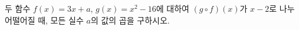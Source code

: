 \hspace*{2mm}\begin{minipage}[t]{\dimexpr\linewidth-2mm\relax}\vspace{0pt}
두 함수 $f(x)=3x+a$, $g(x)=x^2-16$에 대하여 $(g\circ f)(x)$가 $x-2$로 나누어떨어질 때, 모든 실수 $a$의 값의 곱을 구하시오.\end{minipage}
